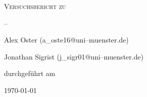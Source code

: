 
\makeatletter
\newcommand*{\protokollemailparse}[1]{%
	\@for\@tempa:=#1\do{%
		\normalsize\email{\@tempa}\\
	}%
}
\makeatother

\begin{titlepage}
	\centering
	{\scshape\LARGE Versuchsbericht zu \par}
	\vspace{1cm}
	{\scshape\huge \varNum {} --\varName\par}
	\vspace{2.5cm}
	{\LARGE \varGruppe\par}
	\vspace{0.5cm}
	{\large Alex Oster (a\_oste16@uni--muenster.de) \par}
	{\large Jonathan Sigrist (j\_sigr01@uni--muenster.de) \par}
	\vfill
	durchgeführt am \varDatum\par

	{\large \varBetreuer} 
	\vfill	
	{\large \today\par}
\end{titlepage}



\maketitle
